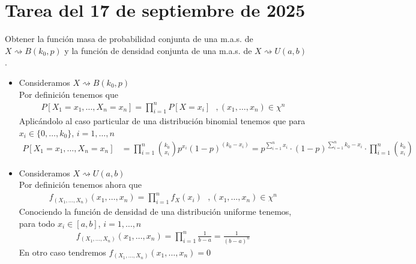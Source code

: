 \section{Tarea del 17 de septiembre de 2025}

\begin{ejercicio}
    Obtener la función masa de probabilidad conjunta de una m.a.s. de $X \rightsquigarrow B(k_0,p)$ y la función de densidad conjunta de una m.a.s. de $X \rightsquigarrow U(a,b)$.\\

    \begin{itemize}
        \item Consideramos $X \rightsquigarrow B(k_0,p)$\\
        
        Por definición tenemos que 
        \begin{gather*}
            P[X_1=x_1, \dots, X_n = x_n] = \prod_{i=1}^{n} P[X=x_i]\ \ \ ,(x_1, \dots,x_n) \in \chi^n 
        \end{gather*}
        Aplicándolo al caso particular de una distribución binomial tenemos que para $x_i\in \{0,\dots,k_0\}$, $i=1,\dots,n$
        \begin{align*}
            P[X_1=x_1, \dots, X_n = x_n] &= \prod_{i=1}^{n} \binom{k_0}{x_i} p^{x_i} (1-p)^{(k_0-x_i)} = p^{\sum\limits_{i=1}^n x_i} \cdot (1-p)^{\sum\limits_{i=1}^n k_0 - x_i} \cdot \prod_{i=1}^{n} \binom{k_0}{x_i}
        \end{align*}

        \item Consideramos $X \rightsquigarrow U(a,b)$\\
        
        Por definición tenemos ahora que
        \begin{gather*}
            f_{(X_1,\dots,X_n)}(x_1,\dots,x_n) = \prod_{i=1}^n f_X(x_i)\ \ \ ,(x_1, \dots,x_n) \in \chi^n 
        \end{gather*}
        Conociendo la función de densidad de una distribución uniforme tenemos, para todo $x_i\in [a,b]$, $i=1,\dots,n$
        \begin{gather*}
            f_{(X_1,\dots,X_n)}(x_1,\dots,x_n) = \prod_{i=1}^n \frac{1}{b-a} = \frac{1}{(b-a)^n}
        \end{gather*}
        En otro caso tendremos $f_{(X_1,\dots,X_n)}(x_1,\dots,x_n) = 0$
    \end{itemize}
\end{ejercicio}

